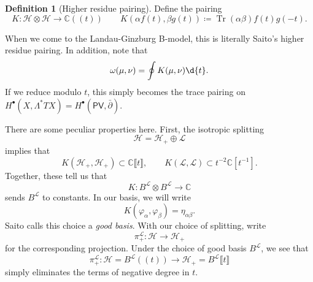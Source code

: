 \documentclass[article,10pt,oneside,oldfontcommands]{memoir}
\theoremstyle{definition}
\newtheorem{defn}[thm]{Definition}
\theoremstyle{remark}
\theoremstyle{plain}
\theoremstyle{definition}
\theoremstyle{remark}
\newcommand{\C}{\mathbb{C}}
\newcommand{\mc}[1]{\mathcal{#1}}
\newcommand{\on}[1]{\operatorname{#1}}
\newcommand{\ms}[1]{\mathsf{#1}}
\newcommand{\1}{\mathbf{1}}
\newcommand{\2}{\mathbf{2}}
\newcommand{\3}{\mathbf{3}}
\newcommand{\ps}[1]{\lBrack #1 \rBrack}
\newcommand{\ls}[1]{(\!( #1 )\!)}
\newcommand{\dbar}{\bar{\partial}}
\begin{document}
\begin{defn}[Higher residue pairing]
    Define the pairing
    \[ K \colon \mc{H} \otimes \mc{H} \to \C\ls{t} \qquad K(\alpha f(t), \beta g(t)) \coloneqq \on{Tr}(\alpha \beta) f(t) g(-t). \]
\end{defn}
When we come to the Landau-Ginzburg B-model, this is literally Saito's higher residue pairing. In addition, note that
\[ \omega(\mu, \nu) = \oint K(\mu, \nu) \d{t}. \]
If we reduce modulo \(t\), this simply becomes the trace pairing on \(H^{\bullet}(X, \Lambda^* TX) = H^{\bullet}(\ms{PV}, \dbar)\). 

There are some peculiar properties here. First, the isotropic splitting
\[ \mc{H} = \mc{H}_+ \oplus \mc{L} \]
implies that
\[ K(\mc{H}_+, \mc{H}_+) \subset \C \ps{t}, \qquad K(\mc{L}, \mc{L}) \subset t^{-2} \C[t^{-1}]. \]
Together, these tell us that
\[ K \colon B^{\mc{L}} \otimes B^{\mc{L}} \to \C \]
sends \(B^{\mc{L}}\) to constants. In our basis, we will write
\[ K(\varphi_{\alpha}, \varphi_{\beta}) = \eta_{\alpha \beta}. \]
Saito calls this choice a \textit{good basis}. With our choice of splitting, write
\[ \pi_+^{\mc{L}} \colon \mc{H} \to \mc{H}_+ \]
for the corresponding projection. Under the choice of good basis \(B^{\mc{L}}\), we see that
\[ \pi_{+}^{\mc{L}} \colon \mc{H} = B^{\mc{L}} \ls{t} \to \mc{H}_+ = B^{\mc{L}} \ps{t} \]
simply eliminates the terms of negative degree in \(t\).
\end{document}
